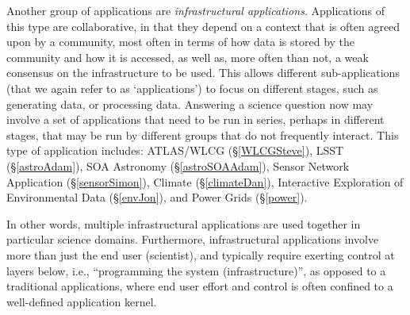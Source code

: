 Another group of applications are {\em infrastructural applications}.
Applications of this type are collaborative, in that they depend on a
context that is often agreed upon by a community, most often in terms
of how data is stored by the community and how it is accessed, as well
as, more often than not, a weak consensus on the infrastructure to be
used. %
This allows different
sub-applications (that we again refer to as `applications') to focus
on different stages, such as generating data, or processing data.
Answering a science question now may involve a set of applications
that need to be run in series, perhaps in different stages, that may
be run by different groups that do not frequently interact.  This type
of application includes: ATLAS/WLCG (\S\ref{WLCGSteve}), LSST
(\S\ref{astroAdam}), SOA Astronomy (\S\ref{astroSOAAdam}), Sensor
Network Application (\S\ref{sensorSimon}), Climate
(\S\ref{climateDan}), Interactive Exploration of Environmental Data
(\S\ref{envJon}), and Power Grids (\S\ref{power}).

In other words, multiple infrastructural applications are used together in particular
science domains.  Furthermore, infrastructural
applications involve more than just the end user (scientist), and
typically require exerting control at layers below, i.e.,
``programming the system (infrastructure)'', as opposed to a
traditional applications, where end user effort and control is often
confined to a well-defined application kernel.




